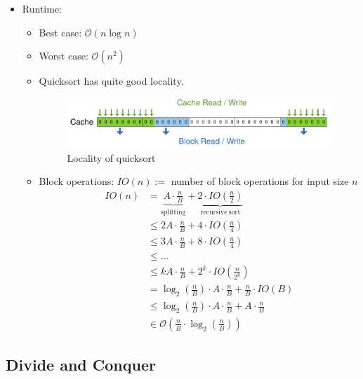 \documentclass[12pt, a4paper]{scrartcl}
\newcommand{\bigO}{\mathcal{O}}
\begin{document}
\begin{itemize}
\begin{enumerate}
  \end{enumerate}
\item Runtime:
  \begin{itemize}
  \item Best case: $\bigO(n\log n)$
  \item Worst case: $\bigO(n^2)$
  \item Quicksort has quite good locality.
    \begin{figure}[htbp]
      \centering
      \includegraphics[width=\textwidth]{quicksort_locality}
      \caption{Locality of quicksort}
      \label{fig:quicksort_locality}
    \end{figure}
  \item Block operations: $IO(n):=$ number of block operations for input size $n$
    \begin{align*}
      IO(n)&=\underbrace{A\cdot\frac{n}{B}}_\mathrm{splitting}+\underbrace{2\cdot IO(\frac{n}{2})}_\mathrm{recursive\ sort}\\
           &\le 2A\cdot\frac{n}{B}+4\cdot IO(\frac{n}{4})\\
           &\le 3A\cdot\frac{n}{B}+8\cdot IO(\frac{n}{4})\\
           &\le \dots\\
           &\le kA\cdot\frac{n}{B}+2^k\cdot IO\left(\frac{n}{2^k}\right)\\
           &=\log_2\left(\frac{n}{B}\right)\cdot A\cdot\frac{n}{B}+\frac{n}{B}\cdot IO\left(B\right)\\
           &\le \log_2\left(\frac{n}{B}\right)\cdot A\cdot\frac{n}{B}+A\cdot\frac{n}{B}\\
           &\in \bigO
             \left(
             \frac{n}{B}\cdot\log_2
             \left(
             \frac{n}{B}
             \right)
             \right)
    \end{align*}
  \end{itemize}

\end{itemize}

\subsection{Divide and Conquer}
\label{sec:divide_and_conquer}
\end{document}
